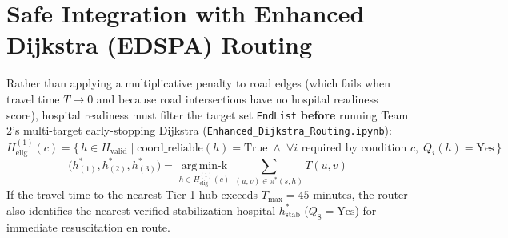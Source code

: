 \documentclass[10pt,a4paper]{article}
\begin{document}
\section{Safe Integration with Enhanced Dijkstra (EDSPA) Routing}
Rather than applying a multiplicative penalty to road edges (which fails when travel time $T \to 0$ and because road intersections have no hospital readiness score), hospital readiness must filter the target set \texttt{EndList} \textbf{before} running Team 2's multi-target early-stopping Dijkstra (\texttt{Enhanced\_Dijkstra\_Routing.ipynb}):
\begin{equation}
    H_{\text{elig}}^{(1)}(c) = \bigl\{\, h \in H_{\text{valid}} \;\big|\; \text{coord\_reliable}(h) = \text{True} \;\wedge\; \forall i \text{ required by condition } c,\; Q_i(h) = \text{Yes} \,\bigr\}
\end{equation}
\begin{equation}
    \bigl(h_{(1)}^*, h_{(2)}^*, h_{(3)}^*\bigr) = \operatorname*{arg\,min\text{-}k}_{h \in H_{\text{elig}}^{(1)}(c)} \sum_{(u,v) \in \pi^*(s, h)} T(u, v)
\end{equation}
If the travel time to the nearest Tier-1 hub exceeds $T_{\max} = 45\text{ minutes}$, the router also identifies the nearest verified stabilization hospital $h_{\text{stab}}^*$ ($Q_8 = \text{Yes}$) for immediate resuscitation en route.



\end{document}
